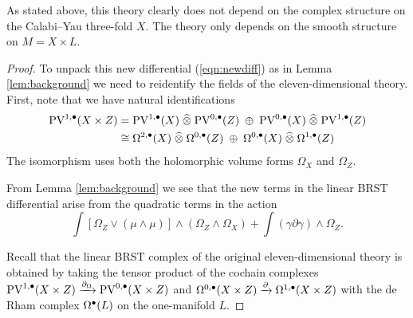 \documentclass[11pt]{amsart}
\def\PV{{\rm PV}}
\begin{document}
As stated above, this theory clearly does not depend on the complex structure on the Calabi--Yau three-fold $X$.
The theory only depends on the smooth structure on $M = X \times L$.

\begin{proof}
To unpack this new differential (\ref{eqn:newdiff}) as in Lemma \ref{lem:background} we need to reidentify the fields of the eleven-dimensional theory.
First, note that we have natural identifications
\begin{align}
  \PV^{1,\bu}(X \times Z) & = \PV^{1,\bu}(X) \; \Hat{\otimes} \; \PV^{0,\bu}(Z)\; \oplus \; \PV^{0,\bu}(X) \; \Hat{\otimes} \; \PV^{1,\bu}(Z) \\ & \cong \Omega^{2,\bu}(X) \; \Hat{\otimes} \; \Omega^{0,\bu} (Z) \; \oplus \; \Omega^{0,\bu}(X) \; \Hat{\otimes} \; \Omega^{1,\bu}(Z) \label{eqn:decomposevf}
\end{align}
The isomorphism uses both the holomorphic volume forms $\Omega_X$ and $\Omega_Z$.

From Lemma \ref{lem:background} we see that the new terms in the linear BRST differential arise from the quadratic terms in the action
\begin{equation}\label{eqn:newterms}
  \int \left[\Omega_Z \vee (\mu \wedge \mu) \right] \wedge (\Omega_Z \wedge \Omega_X) + \int \left(\gamma \partial \gamma\right) \wedge \Omega_Z .
\end{equation}

Recall that the linear BRST complex of the original eleven-dimensional theory is obtained by taking the tensor product of the cochain complexes $\PV^{1,\bu}(X \times Z) \xto{\partial_\Omega} \PV^{0,\bu}(X \times Z)$ and $\Omega^{0,\bullet}(X \times Z) \xrightarrow{\partial} \Omega^{1,\bullet}(X \times Z)$ with the de Rham complex $\Omega^\bullet(L)$ on the one-manifold $L$.


\end{proof}
\end{document}
